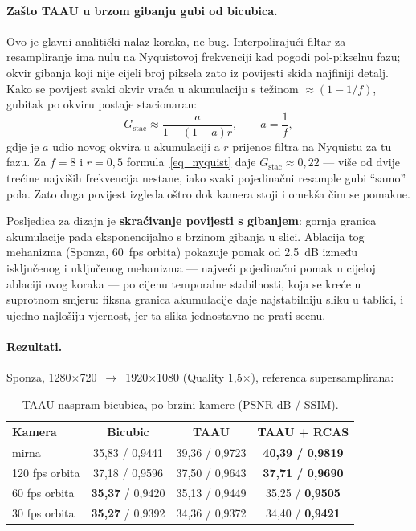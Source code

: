 \documentclass{mathos}
\begin{document}
\paragraph{Zašto TAAU u brzom gibanju gubi od bicubica.} Ovo je glavni
analitički nalaz koraka, ne bug. Interpolirajući filtar za resampliranje ima
nulu na Nyquistovoj frekvenciji kad pogodi pol-pikselnu fazu; okvir gibanja
koji nije cijeli broj piksela zato iz povijesti skida najfiniji detalj. Kako
se povijest svaki okvir vraća u akumulaciju s težinom $\approx(1-1/f)$, gubitak
po okviru postaje stacionaran:
\begin{equation}
G_{\text{stac}} \approx \frac{a}{1-(1-a)r}, \qquad a = \frac{1}{f},
\label{eq_nyquist}
\end{equation}
gdje je $a$ udio novog okvira u akumulaciji a $r$ prijenos filtra na
Nyquistu za tu fazu. Za $f=8$ i $r=0,5$ formula~\eqref{eq_nyquist} daje
$G_{\text{stac}}\approx0,22$ — više od dvije trećine najviših frekvencija
nestane, iako svaki pojedinačni resample gubi ``samo'' pola. Zato duga
povijest izgleda oštro dok kamera stoji i omekša čim se pomakne.

Posljedica za dizajn je \textbf{skraćivanje povijesti s gibanjem}: gornja
granica akumulacije pada eksponencijalno s brzinom gibanja u slici. Ablacija
tog mehanizma (Sponza, 60~fps orbita) pokazuje pomak od 2,5~dB između
isključenog i uključenog mehanizma — najveći pojedinačni pomak u cijeloj
ablaciji ovog koraka — po cijenu temporalne stabilnosti, koja se kreće u
suprotnom smjeru: fiksna granica akumulacije daje najstabilniju sliku u
tablici, i ujedno najlošiju vjernost, jer ta slika jednostavno ne prati
scenu.

\paragraph{Rezultati.} Sponza, 1280$\times$720~$\to$~1920$\times$1080
(Quality 1,5$\times$), referenca supersamplirana:

\begin{table}[hbtp]
\centering
\begin{tabular}{|l|c|c|c|}\hline
Kamera & Bicubic & TAAU & TAAU + RCAS \\\hline
mirna & 35,83 / 0,9441 & 39,36 / 0,9723 & \textbf{40,39 / 0,9819} \\\hline
120 fps orbita & 37,18 / 0,9596 & 37,50 / 0,9643 & \textbf{37,71 / 0,9690} \\\hline
60 fps orbita & \textbf{35,37} / 0,9420 & 35,13 / 0,9449 & 35,25 / \textbf{0,9505} \\\hline
30 fps orbita & \textbf{35,27} / 0,9392 & 34,36 / 0,9372 & 34,40 / \textbf{0,9421} \\\hline
\end{tabular}
\caption{TAAU naspram bicubica, po brzini kamere (PSNR dB / SSIM).}
\label{table_m4_rezultati}
\end{table}
\end{document}
